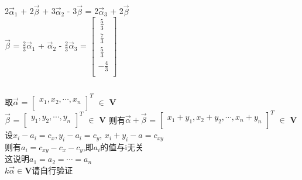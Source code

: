 \documentclass{ctexart}
\begin{document}
        \subsection{}
            \begin{mdframed}
                2$\vec{\alpha}_1$ + 2$\vec{\beta}$ + 3$\vec{\alpha}_2$ - 3$\vec{\beta}$
                 = 2$\vec{\alpha}_3$ + 2$\vec{\beta}$
                 \\$\vec{\beta}$ = $\frac{2}{3} \vec{\alpha}_1$ + $\vec{\alpha}_2$ - $\frac{2}{3} \vec{\alpha}_3$
                 = $\begin{bmatrix}
                    ~\frac{5}{3}\\
                    ~\frac{7}{3}\\
                    ~\frac{5}{3}\\
                    -\frac{4}{3}\\
                    \end{bmatrix}$            
            \end{mdframed}

        \subsection{}
            \begin{mdframed}
                取$\vec{\alpha}$ = 
                $\begin{bmatrix}
                    x_1,x_2,\cdots,x_n\\
                \end{bmatrix}^{T}$ $\in$ $\mathbf{V}$
                \\ $\vec{\beta}$ = 
                $\begin{bmatrix}
                    y_1,y_2,\cdots,y_n\\
                \end{bmatrix}^T$ $\in$ $\mathbf{V}$
                则有$\vec{\alpha}+\vec{\beta}$ = 
                $\begin{bmatrix}
                    x_1+y_1 , x_2+y_2 , \cdots , x_n+y_n\\
                \end{bmatrix}^{T}$ $\in$ $\mathbf{V}$\\
            设$x_i - a_i = c_x , y_i - a_i = c_y$,
              $x_i + y_i - a = c_{xy}$\\
            则有$a_i = c_{xy}-c_x-c_y$,即$a_i$的值与i无关\\
            这说明$a_1=a_2=\cdots=a_n$\\
            $k\vec{\alpha}\in\mathbf{V}$请自行验证
            \end{mdframed}
            
\end{document}
